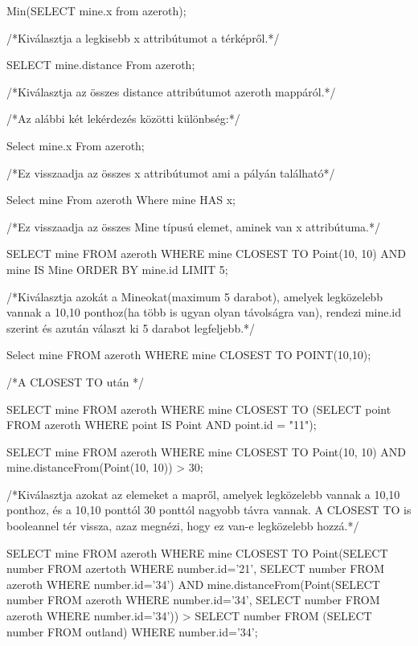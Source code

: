 \begin{sql}
\begin{sql}
Min(SELECT mine.x from azeroth);
\end{sql}
/*Kiválasztja a legkisebb x attribútumot a térképről.*/

\begin{sql}
SELECT mine.distance From azeroth;
\end{sql}
/*Kiválasztja az összes distance attribútumot azeroth mappáról.*/

/*Az alábbi két lekérdezés közötti különbség:*/
\begin{sql}
Select mine.x From azeroth; 
\end{sql}
/*Ez visszaadja az összes x attribútumot ami a pályán található*/
\begin{sql}
Select mine From azeroth Where mine HAS x;
\end{sql}
/*Ez visszaadja az összes Mine típusú elemet, aminek van x attribútuma.*/

\begin{sql}
SELECT mine
FROM azeroth
WHERE mine CLOSEST TO Point(10, 10) AND mine IS Mine
ORDER BY mine.id
LIMIT 5;
\end{sql}
/*Kiválasztja azokát a Mineokat(maximum 5 darabot), amelyek legközelebb vannak a 10,10 ponthoz(ha több is ugyan olyan távolságra van), 
rendezi mine.id szerint és azután választ ki 5 darabot legfeljebb.*/

\begin{sql}
Select mine
FROM azeroth
WHERE mine CLOSEST TO POINT(10,10);
\end{sql}
/*A CLOSEST TO után */

\begin{sql}
SELECT mine
FROM azeroth
WHERE mine CLOSEST TO (SELECT point FROM azeroth WHERE point IS Point AND point.id = "11");
\end{sql}

\begin{sql}
SELECT mine
FROM azeroth
WHERE mine CLOSEST TO Point(10, 10) AND mine.distanceFrom(Point(10, 10)) > 30;
\end{sql}
/*Kiválasztja azokat az elemeket a mapről, amelyek legközelebb vannak a 10,10 ponthoz, és a 10,10 ponttól 30 ponttól nagyobb távra vannak.
A CLOSEST TO is booleannel tér vissza, azaz megnézi, hogy ez van-e legközelebb hozzá.*/

\begin{sql}
SELECT mine
FROM azeroth
WHERE mine CLOSEST TO Point(SELECT number FROM azertoth WHERE number.id='21', SELECT number FROM azeroth WHERE number.id='34')
 AND mine.distanceFrom(Point(SELECT number FROM azeroth WHERE number.id='34', SELECT number FROM azeroth WHERE number.id='34')) > SELECT number FROM (SELECT number FROM outland) WHERE number.id='34';
\end{sql}


\end{sql}
